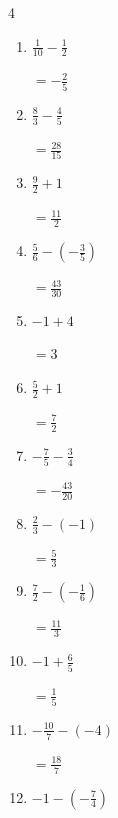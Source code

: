 \begin{multicols}{4}
\begin{enumerate}
        $\displaystyle =-\frac{61}{42}$

  \item $\displaystyle \frac{1}{10} - \frac{1}{2}$

        $\displaystyle =-\frac{2}{5}$

  \item $\displaystyle \frac{8}{3} - \frac{4}{5}$

        $\displaystyle =\frac{28}{15}$

\columnbreak %

\resetques

  \item $\displaystyle \frac{9}{2} + 1$

        $\displaystyle =\frac{11}{2}$

  \item $\displaystyle \frac{5}{6} - \left(-\frac{3}{5}\right)$

        $\displaystyle =\frac{43}{30}$

  \item $\displaystyle -1 + 4$

        $\displaystyle =3$

  \item $\displaystyle \frac{5}{2} + 1$

        $\displaystyle =\frac{7}{2}$

  \item $\displaystyle -\frac{7}{5} - \frac{3}{4}$

        $\displaystyle =-\frac{43}{20}$

  \item $\displaystyle \frac{2}{3} - \left(-1\right)$

        $\displaystyle =\frac{5}{3}$

  \item $\displaystyle \frac{7}{2} - \left(-\frac{1}{6}\right)$

        $\displaystyle =\frac{11}{3}$

  \item $\displaystyle -1 + \frac{6}{5}$

        $\displaystyle =\frac{1}{5}$

  \item $\displaystyle -\frac{10}{7} - \left(-4\right)$

        $\displaystyle =\frac{18}{7}$

  \item $\displaystyle -1 - \left(-\frac{7}{4}\right)$


\end{enumerate}
\end{multicols}
